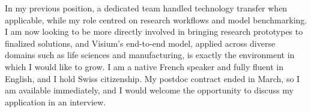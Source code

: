\documentclass[11pt, a4paper]{awesome-cv}
\begin{document}
\begin{cvletter}
In my previous position, a dedicated team handled technology transfer when applicable, while my role centred on research workflows and model benchmarking. I am now looking to be more directly involved in bringing research prototypes to finalized solutions, and Visium's end-to-end model, applied across diverse domains such as life sciences and manufacturing, is exactly the environment in which I would like to grow.
I am a native French speaker and fully fluent in English, and I hold Swiss citizenship. My postdoc contract ended in March, so I am available immediately, and I would welcome the opportunity to discuss my application in an interview.



\end{cvletter}


\makeletterclosing
\end{document}
